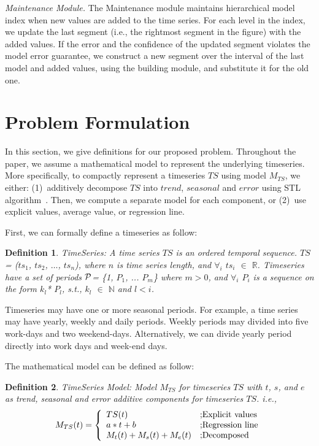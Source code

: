 \documentclass[10pt,conference,letterpaper]{IEEEtran}
\newcommand{\LNs}{hierarchical model index }
\newtheorem{mydef}{Definition}
\begin{document}
{\em Maintenance Module.} 
The Maintenance module maintains \LNs  when new values are added to the time series.
For each level in the index,  we update the last segment (i.e., the rightmost segment in the figure) with the added values. 
If the error and the confidence of the updated segment violates the model error guarantee, we construct a new segment over the interval of the last model and added values, using the building module, and substitute it for the old one. 


\section{Problem Formulation}
\label{sec:form}
In this section, we give  definitions for our proposed problem. Throughout the paper, we assume a mathematical model to  represent the underlying timeseries. More specifically, to compactly represent a timeseries $TS$ using model  $M_{TS}$, we either: (1)~additively decompose $TS$ into $trend$, $seasonal$ and $error$ using STL algorithm~\cite{STL}. Then, we compute a separate model for each component, or (2)~use explicit values, average  value, or regression line. %

First, we can formally define a timeseries as follow:
\begin{mydef} TimeSeries: A time series $TS$ is an ordered temporal sequence. $TS$= ($ts_1$, $ts_2$, $\dots$, $ts_n$), where $n$ is time series length, and $\forall_i$ $ts_i$ $\in$ $\mathbb{R}$. Timeseries have a set of periods $\cal P$= \{1, $P_1$, ... $P_m$\} where $m > 0$, and $\forall_i$ $P_i$ is a sequence on the form $k_l$* $P_l$, s.t., $k_l$ $\in$ $\mathbb{N}$ and $l<i$.
\end{mydef}

Timeseries may have one or more seasonal periods. For example, a time series may have  yearly, weekly and daily periods. Weekly periods may divided into five work-days and two weekend-days. Alternatively, we can  divide yearly period directly into work days and week-end days.
 
The mathematical model can be defined as follow:
\begin{mydef} TimeSeries Model: Model $M_{TS}$ for timeseries $TS$ with  $t$, $s$, and $e$ as trend, seasonal and error additive components for timeseries $TS$. i.e.,   
\[
  M_{TS}(t) = \left\{ 
  \begin{array}{l l}
    TS (t) &  \text{;Explicit values}
    \\
    a*t+b             & \text{;Regression line} \\
    M_{t}(t)+M_{s}(t)+M_{e}(t) &  \text{;Decomposed}\\
  \end{array} \right.
\]
\end{mydef}
\end{document}
